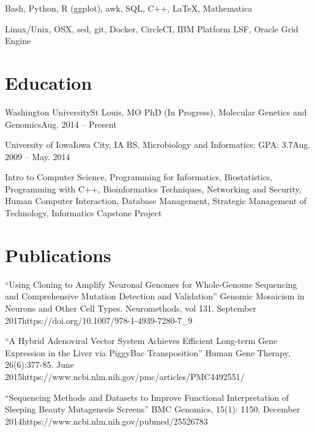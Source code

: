         {Bash, Python, R (ggplot), awk, SQL, C++, \LaTeX, Mathematica}
          
        {Linux/Unix, OSX, sed, git, Docker, CircleCI, IBM Platform LSF, Oracle Grid Engine}
          
    \resumeSubHeadingListEnd

\section{Education}
   \resumeSubHeadingListStart
   
      \resumeSubheading
      {Washington University}{St Louis, MO}
      {PhD (In Progress), Molecular Genetics and Genomics}{Aug. 2014 -- Present}
      
      \resumeSubheading
      {University of Iowa}{Iowa City, IA}
      {BS, Microbiology and Informatics;  GPA: 3.7}{Aug. 2009 -- May. 2014}
      
      \resumeItemListStart
      
         {Intro to Computer Science, Programming for Informatics, Biostatistics, Programming with C++, Bioinformatics Techniques, Networking and Security, Human Computer Interaction, Database Management, Strategic Management of Technology, Informatics Capstone Project}
      
      \resumeItemListEnd
   
   \resumeSubHeadingListEnd

\section{Publications}
    \resumeSubHeadingListStart

		{ ``Using Cloning to Amplify Neuronal Genomes for Whole-Genome Sequencing and Comprehensive Mutation Detection and Validation'' Genomic Mosaicism in Neurons and Other Cell Types. Neuromethods, vol 131. September 2017}{https://doi.org/10.1007/978-1-4939-7280-7\_9}

		{ ``A Hybrid Adenoviral Vector System Achieves Efficient Long-term Gene Expression in the Liver via PiggyBac Transposition'' Human Gene Therapy, 26(6):377-85. June 2015}{https://www.ncbi.nlm.nih.gov/pmc/articles/PMC4492551/}
      
		{ ``Sequencing Methods and Datasets to Improve Functional Interpretation of Sleeping Beauty Mutagenesis Screens'' BMC Genomics, 15(1): 1150. December 2014}{https://www.ncbi.nlm.nih.gov/pubmed/25526783}

    \resumeSubHeadingListEnd


